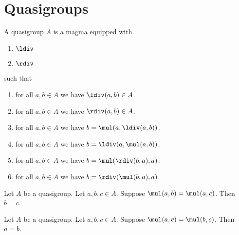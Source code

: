 

\section{Quasigroups}

\begin{struct}\label{quasigroup}
    A quasigroup $A$ is a magma equipped with
    \begin{enumerate}
        \item $\ldiv$
        \item $\rdiv$
    \end{enumerate}
    such that
    \begin{enumerate}
        \item for all $a, b\in A$ we have $\ldiv (a,b)\in A$.
        \item for all $a, b\in A$ we have $\rdiv (a,b)\in A$.
        \item for all $a,b \in A$ we have $b = \mul(a,\ldiv (a,b))$.
        \item for all $a,b \in A$ we have $b = \ldiv(a,\mul (a,b))$.
        \item for all $a,b \in A$ we have $b = \mul(\rdiv (b,a),a)$.
        \item for all $a,b \in A$ we have $b = \rdiv(\mul (b,a),a)$.
    \end{enumerate}
\end{struct}

\begin{lemma}\label{quasigroup_cancel_left}
    Let $A$ be a quasigroup.
    Let $a,b,c \in A$.
    Suppose $\mul(a,b) = \mul(a,c)$.
    Then $b = c$.
\end{lemma}

\begin{lemma}\label{quasigroup_cancel_right}
    Let $A$ be a quasigroup.
    Let $a,b,c \in A$.
    Suppose $\mul(a,c) = \mul(b,c)$.
    Then $a = b$.
\end{lemma}
